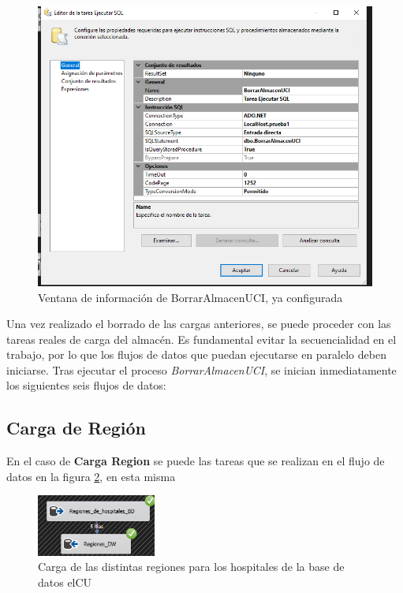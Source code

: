 \documentclass[12pt, a4paper, twoside]{article}
\begin{document}
	\begin{figure}[h!]
		\centering
		\includegraphics[width=1\textwidth]{image/101_BorrarAlmacenUCI.png}
		\caption{Ventana de información de BorrarAlmacenUCI, ya configurada}
		\label{fig:3}
	\end{figure}
	
	Una vez realizado el borrado de las cargas anteriores, se puede proceder con las tareas reales de carga del almacén. Es fundamental evitar la secuencialidad en el trabajo, por lo que los flujos de datos que puedan ejecutarse en paralelo deben iniciarse. Tras ejecutar el proceso \textit{BorrarAlmacenUCI}, se inician inmediatamente los siguientes seis flujos de datos:
	
	
	\subsection{Carga de Región}
	
	En el caso de \textbf{Carga Region} se puede las tareas que se realizan en el flujo de datos en la figura \ref{fig:4}, en esta misma 
	
	\begin{figure}[h]
		\centering
		\includegraphics[width=0.35\textwidth]{image/103_region.png}
		\caption{Carga de las distintas regiones para los hospitales de la base de datos elCU}
		\label{fig:4}
	\end{figure}
	
\end{document}
